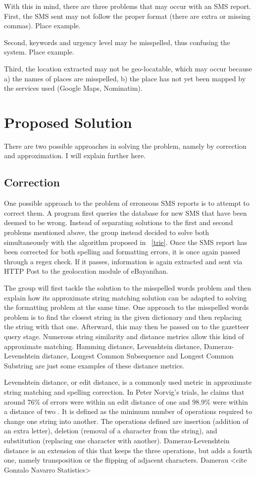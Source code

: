 \documentclass{acm_proc_article-sp}
\begin{document}
With this in mind, there are three problems that may occur with an SMS report.
First, the SMS sent may not follow the proper format (there are extra or missing commas). Place example.

Second, keywords and urgency level may be misspelled, thus confusing the system. Place example.

Third, the location extracted may not be geo-locatable, which may occur because a) the names of places are misspelled, b) the place has not yet been mapped by the services used
(Google Maps, Nominatim).

\section{Proposed Solution}
There are two possible approaches in solving the problem, namely by correction and approximation. I will explain further here.

\subsection{Correction}
One possible approach to the problem of erroneous SMS reports is to attempt to correct them. A program first queries the database for new SMS that have been deemed to be wrong. Instead of separating solutions to the first and second problems mentioned above, the group instead decided to solve both simultaneously with the algorithm proposed in ~\ref{trie}. Once the SMS report has been corrected for both spelling and formatting errors, it is once again passed through a regex check. If it passes, information is again extracted and sent via HTTP Post to the geolocation module of eBayanihan. 

The group will first tackle the solution to the misspelled words problem and then explain how its approximate string matching solution can be adapted to solving the formatting problem at the same time. One approach to the misspelled words problem is to find the closest string in the given dictionary and then replacing the string with that one. Afterward, this may then be passed on to the gazetteer query stage. Numerous string similarity and distance metrics allow this kind of approximate matching. Hamming distance, Levenshtein distance, Damerau-Levenshtein distance, Longest Common Subsequence and Longest Common Substring are just some examples of these distance metrics. 

Levenshtein distance, or edit distance, is a commonly used metric in approximate string matching and spelling correction. In Peter Norvig's trials, he claims that around 76\% of errors were within an edit distance of one and 98.9\% were within a distance of two \cite{norvig:howto}. It is defined as the minimum number of operations required to change one string into another. The operations defined are insertion (addition of an extra letter), deletion (removal of a character from the string), and substitution (replacing one character with another). Damerau-Levenshtein distance is an extension of this that keeps the three operations, but adds a fourth one, namely transposition or the flipping of adjacent characters. Damerau <cite Gonzalo Navarro Statistics>   
\end{document}
